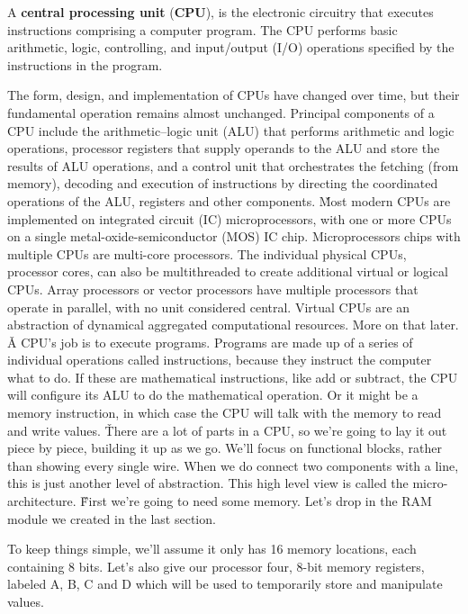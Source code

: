 A \textbf{central processing unit} (\textbf{CPU}), is the electronic circuitry that executes instructions comprising
a computer program. The CPU performs basic arithmetic, logic, controlling, and input/output (I/O) operations
specified by the instructions in the program.
\ed


The form, design, and implementation of CPUs have changed over time, but their fundamental operation remains almost
unchanged. Principal components of a CPU include the arithmetic–logic unit (ALU) that performs arithmetic and logic
operations, processor registers that supply operands to the ALU and store the results of ALU operations, and a
control unit that orchestrates the fetching (from memory), decoding and execution of instructions by directing the
coordinated operations of the ALU, registers and other components. \v

Most modern CPUs are implemented on integrated circuit (IC) microprocessors, with one or more CPUs on a single
metal-oxide-semiconductor (MOS) IC chip. Microprocessors chips with multiple CPUs are multi-core processors. The
individual physical CPUs, processor cores, can also be multithreaded to create additional virtual or logical CPUs.
Array processors or vector processors have multiple processors that operate in parallel, with no unit considered
central. Virtual CPUs are an abstraction of dynamical aggregated computational resources. More on that later. \v

A CPU's job is to execute programs. Programs are made up of a series of individual operations called instructions,
because they instruct the computer what to do. If these are mathematical instructions, like add or subtract, the CPU
will configure its ALU to do the mathematical operation. Or it might be a memory instruction, in which case the CPU
will talk with the memory to read and write values. \v

There are a lot of parts in a CPU, so we're going to lay it out piece by piece, building it up as we go. We'll focus
on functional blocks, rather than showing every single wire. When we do connect two components with a line, this is
just another level of abstraction. This high level view is called the micro-architecture. \v

First we're going to need some memory. Let's drop in the RAM module we created in the last section.

\be
To keep things simple, we'll assume it only has 16 memory locations, each containing 8 bits. Let's also give our
processor four, 8-bit memory registers, labeled A, B, C and D which will be used to temporarily store and manipulate
values.

